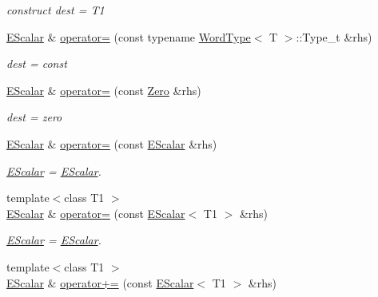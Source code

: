 \begin{DoxyCompactItemize}
\begin{DoxyCompactList}\small\item\em construct dest = T1 \end{DoxyCompactList}\item 
\mbox{\hyperlink{classENSEM_1_1EScalar}{E\+Scalar}} \& \mbox{\hyperlink{classENSEM_1_1EScalar_a01ae8ddc1b0d0e4ecd65f5de624faee5}{operator=}} (const typename \mbox{\hyperlink{structENSEM_1_1WordType}{Word\+Type}}$<$ T $>$\+::Type\+\_\+t \&rhs)
\begin{DoxyCompactList}\small\item\em dest = const \end{DoxyCompactList}\item 
\mbox{\hyperlink{classENSEM_1_1EScalar}{E\+Scalar}} \& \mbox{\hyperlink{classENSEM_1_1EScalar_a9619fd24baf50fd03986c3056a484cb9}{operator=}} (const \mbox{\hyperlink{structENSEM_1_1Zero}{Zero}} \&rhs)
\begin{DoxyCompactList}\small\item\em dest = zero \end{DoxyCompactList}\item 
\mbox{\hyperlink{classENSEM_1_1EScalar}{E\+Scalar}} \& \mbox{\hyperlink{classENSEM_1_1EScalar_ade0daedd37868c24651613bb6f499fd4}{operator=}} (const \mbox{\hyperlink{classENSEM_1_1EScalar}{E\+Scalar}} \&rhs)
\begin{DoxyCompactList}\small\item\em \mbox{\hyperlink{classENSEM_1_1EScalar}{E\+Scalar}} = \mbox{\hyperlink{classENSEM_1_1EScalar}{E\+Scalar}}. \end{DoxyCompactList}\item 
{\footnotesize template$<$class T1 $>$ }\\\mbox{\hyperlink{classENSEM_1_1EScalar}{E\+Scalar}} \& \mbox{\hyperlink{classENSEM_1_1EScalar_a8ec804b8b082a748bb364fbb4a511757}{operator=}} (const \mbox{\hyperlink{classENSEM_1_1EScalar}{E\+Scalar}}$<$ T1 $>$ \&rhs)
\begin{DoxyCompactList}\small\item\em \mbox{\hyperlink{classENSEM_1_1EScalar}{E\+Scalar}} = \mbox{\hyperlink{classENSEM_1_1EScalar}{E\+Scalar}}. \end{DoxyCompactList}\item 
{\footnotesize template$<$class T1 $>$ }\\\mbox{\hyperlink{classENSEM_1_1EScalar}{E\+Scalar}} \& \mbox{\hyperlink{classENSEM_1_1EScalar_aa34f8bd686adb144a6d0e5e8f69787ce}{operator+=}} (const \mbox{\hyperlink{classENSEM_1_1EScalar}{E\+Scalar}}$<$ T1 $>$ \&rhs)

\end{DoxyCompactItemize}
